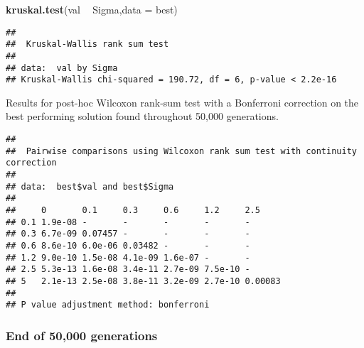 \documentclass[]{book}
\newenvironment{Shaded}{\begin{snugshade}}{\end{snugshade}}
\newcommand{\DataTypeTok}[1]{\textcolor[rgb]{0.13,0.29,0.53}{#1}}
\newcommand{\KeywordTok}[1]{\textcolor[rgb]{0.13,0.29,0.53}{\textbf{#1}}}
\newcommand{\NormalTok}[1]{#1}
\newcommand{\OperatorTok}[1]{\textcolor[rgb]{0.81,0.36,0.00}{\textbf{#1}}}
\newcommand{\OtherTok}[1]{\textcolor[rgb]{0.56,0.35,0.01}{#1}}
\newcommand{\StringTok}[1]{\textcolor[rgb]{0.31,0.60,0.02}{#1}}
\begin{document}
\begin{Shaded}
\begin{Highlighting}[]
\KeywordTok{kruskal.test}\NormalTok{(val }\OperatorTok{~}\StringTok{ }\NormalTok{Sigma,}\DataTypeTok{data =}\NormalTok{ best)}
\end{Highlighting}
\end{Shaded}

\begin{verbatim}
## 
##  Kruskal-Wallis rank sum test
## 
## data:  val by Sigma
## Kruskal-Wallis chi-squared = 190.72, df = 6, p-value < 2.2e-16
\end{verbatim}

Results for post-hoc Wilcoxon rank-sum test with a Bonferroni correction on the best performing solution found throughout 50,000 generations.

\begin{Shaded}
\end{Shaded}

\begin{verbatim}
## 
##  Pairwise comparisons using Wilcoxon rank sum test with continuity correction 
## 
## data:  best$val and best$Sigma 
## 
##     0       0.1     0.3     0.6     1.2     2.5    
## 0.1 1.9e-08 -       -       -       -       -      
## 0.3 6.7e-09 0.07457 -       -       -       -      
## 0.6 8.6e-10 6.0e-06 0.03482 -       -       -      
## 1.2 9.0e-10 1.5e-08 4.1e-09 1.6e-07 -       -      
## 2.5 5.3e-13 1.6e-08 3.4e-11 2.7e-09 7.5e-10 -      
## 5   2.1e-13 2.5e-08 3.8e-11 3.2e-09 2.7e-10 0.00083
## 
## P value adjustment method: bonferroni
\end{verbatim}

\hypertarget{end-of-50000-generations-16}{%
\subsubsection{End of 50,000 generations}\label{end-of-50000-generations-16}}
\end{document}
